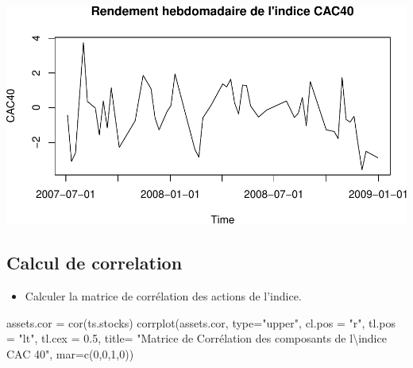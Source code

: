\documentclass[
]{article}
\newenvironment{Shaded}{\begin{snugshade}}{\end{snugshade}}
\newcommand{\AttributeTok}[1]{\textcolor[rgb]{0.77,0.63,0.00}{#1}}
\newcommand{\DecValTok}[1]{\textcolor[rgb]{0.00,0.00,0.81}{#1}}
\newcommand{\FloatTok}[1]{\textcolor[rgb]{0.00,0.00,0.81}{#1}}
\newcommand{\FunctionTok}[1]{\textcolor[rgb]{0.00,0.00,0.00}{#1}}
\newcommand{\NormalTok}[1]{#1}
\newcommand{\OtherTok}[1]{\textcolor[rgb]{0.56,0.35,0.01}{#1}}
\newcommand{\SpecialCharTok}[1]{\textcolor[rgb]{0.00,0.00,0.00}{#1}}
\newcommand{\StringTok}[1]{\textcolor[rgb]{0.31,0.60,0.02}{#1}}
\providecommand{\tightlist}{%
  \setlength{\itemsep}{0pt}\setlength{\parskip}{0pt}}
\begin{document}
\includegraphics{TP-1_files/figure-latex/plot-cac-2-1.pdf}

\hypertarget{calcul-de-correlation}{%
\subsection{Calcul de correlation}\label{calcul-de-correlation}}

\begin{itemize}
\tightlist
\item
  Calculer la matrice de corrélation des actions de l'indice.
\end{itemize}

\begin{Shaded}
\begin{Highlighting}[]
\NormalTok{assets.cor }\OtherTok{=} \FunctionTok{cor}\NormalTok{(ts.stocks)}
\FunctionTok{corrplot}\NormalTok{(assets.cor, }\AttributeTok{type=}\StringTok{"upper"}\NormalTok{, }\AttributeTok{cl.pos =} \StringTok{"r"}\NormalTok{, }\AttributeTok{tl.pos =} \StringTok{"lt"}\NormalTok{, }
         \AttributeTok{tl.cex =} \FloatTok{0.5}\NormalTok{, }\AttributeTok{title=} \StringTok{"Matrice de Corrélation des composants de l}\SpecialCharTok{\textbackslash{}\textquotesingle{}}\StringTok{indice CAC 40"}\NormalTok{, }\AttributeTok{mar=}\FunctionTok{c}\NormalTok{(}\DecValTok{0}\NormalTok{,}\DecValTok{0}\NormalTok{,}\DecValTok{1}\NormalTok{,}\DecValTok{0}\NormalTok{))}
\end{Highlighting}
\end{Shaded}
\end{document}
